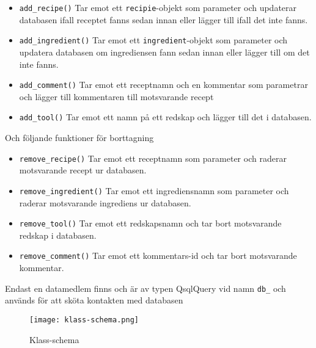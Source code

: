\begin{itemize}
\item \verb+add_recipe()+ Tar emot ett \verb+recipie+-objekt som parameter och updaterar
  databasen ifall receptet fanns sedan innan eller lägger till ifall det inte
  fanns.

\item \verb+add_ingredient()+ Tar emot ett \verb+ingredient+-objekt som parameter
  och updatera databasen om ingrediensen fann sedan innan eller lägger till om
  det inte fanns.

\item \verb+add_comment()+ Tar emot ett receptnamn och en kommentar som
  parametrar och lägger till kommentaren till motsvarande recept

\item \verb+add_tool()+ Tar emot ett namn på ett redskap och lägger till det i
  databasen.

\end{itemize}


Och följande funktioner för borttagning

\begin{itemize}

\item \verb+remove_recipe()+ Tar emot ett receptnamn som parameter och raderar
  motsvarande recept ur databasen.

\item \verb+remove_ingredient()+ Tar emot ett ingrediensnamn som parameter och
  raderar motsvarande ingrediens ur databasen.

\item \verb+remove_tool()+ Tar emot ett redskapsnamn och tar bort motsvarande
  redskap i databasen.

\item \verb+remove_comment()+ Tar emot ett kommentars-id och tar bort
  motsvarande kommentar.
  
\end{itemize}

Endast en datamedlem finns och är av typen QsqlQuery vid namn \verb+db_+ och
används för att sköta kontakten med databasen





\begin{figure}[h]
\centering
\texttt{[image: klass-schema.png]}
\caption{Klass-schema}
\label{fig:classes}
\end{figure}


